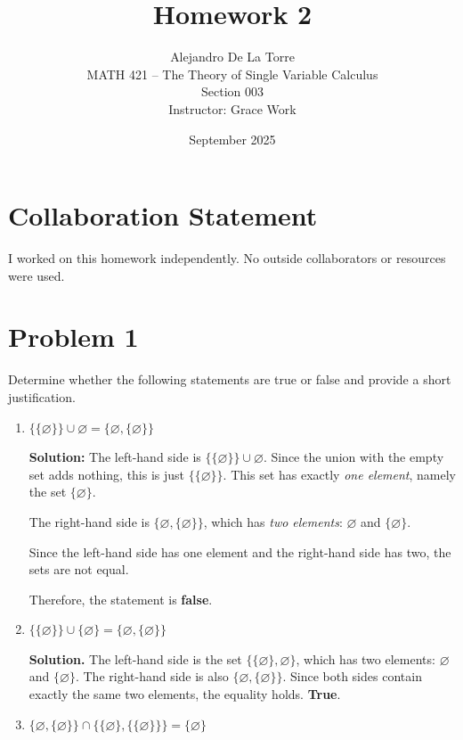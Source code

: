 \documentclass[12pt]{article}
\title{Homework 2}
\author{Alejandro De La Torre \\ MATH 421 -- The Theory of Single Variable Calculus \\ Section 003 \\ Instructor: Grace Work}
\date{September 2025}
\begin{document}
\maketitle

\section*{Collaboration Statement}
I worked on this homework independently. No outside collaborators or resources were used.

\section*{Problem 1}
Determine whether the following statements are true or false and provide a short justification.
\begin{enumerate}[label=\Alph*.]
   \item $\{\{\varnothing\}\} \cup \varnothing = \{\varnothing, \{\varnothing\}\}$

   \textbf{Solution:} The left-hand side is $\{\{\varnothing\}\} \cup \varnothing$. 
   Since the union with the empty set adds nothing, this is just $\{\{\varnothing\}\}$. 
   This set has exactly \emph{one element}, namely the set $\{\varnothing\}$.
   
   The right-hand side is $\{\varnothing, \{\varnothing\}\}$, which has 
   \emph{two elements}: $\varnothing$ and $\{\varnothing\}$. 
   
   Since the left-hand side has one element and the right-hand side has two, the sets are not equal. 
   
   Therefore, the statement is \textbf{false}.
   
   \item $\{\{\varnothing\}\}\cup\{\varnothing\}=\{\varnothing,\{\varnothing\}\}$

   \textbf{Solution.} The left-hand side is the set $\{\{\varnothing\},\varnothing\}$, which has two elements: $\varnothing$ and $\{\varnothing\}$.  
   The right-hand side is also $\{\varnothing,\{\varnothing\}\}$.  
   Since both sides contain exactly the same two elements, the equality holds.  
   \textbf{True}.
   
   \vspace{0.2cm}
   
   \item $\{\varnothing,\{\varnothing\}\}\cap\{\{\varnothing\},\{\{\varnothing\}\}\}=\{\varnothing\}$
   

\end{enumerate}
\end{document}
